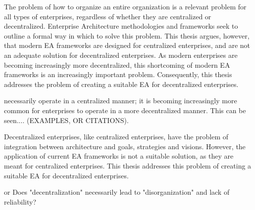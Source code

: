 The problem of how to organize an entire organization is a relevant problem for all types of enterprises, regardless of whether they are centralized or decentralized. Enterprise Architecture methodologies and frameworks seek to outline a formal way in which to solve this problem. This thesis argues, however, that modern EA frameworks are designed for centralized enterprises, and are not an adequate solution for decentralized enterprises. As modern enterprises are becoming increasingly more decentralized, this shortcoming of modern EA frameworks is an increasingly important problem. Consequently, this thesis addresses the problem of creating a suitable EA for decentralized enterprises.




necessarily operate in a centralized manner; it is becoming increasingly more common for enterprises to operate in a more decentralized manner. This can be seen.... (EXAMPLES, OR CITATIONS).

Decentralized enterprises, like centralized enterprises, have the problem of integration between architecture and goals, strategies and visions.  However, the application of current EA frameworks is not a suitable solution, as they are meant for centralized enterprises. This thesis addresses this problem of creating a suitable EA for decentralized enterprises.



or
Does "decentralization" necessarily lead to "disorganization" and lack of reliability?